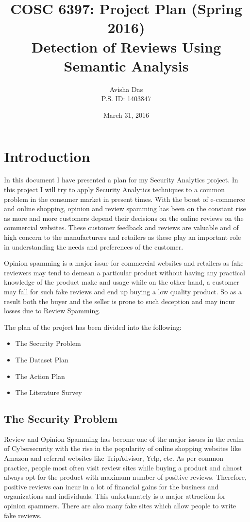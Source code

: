 \documentclass[11pt, a4paper]{article}
\title{COSC 6397: Project Plan (Spring 2016)\\
Detection of Reviews Using Semantic Analysis
}
\author{Avisha Das \\
P.S. ID: 1403847}
\date{March 31, 2016}
\begin{document}
\maketitle


\section{Introduction}

In this document I have presented a plan for my Security Analytics project. In this project I will try to apply Security Analytics techniques to a common problem in the consumer market in present times. With the boost of e-commerce and online shopping, opinion and review spamming has been on the constant rise as more and more customers depend their decisions on the online reviews on the commercial websites. These customer feedback and reviews are valuable and of high concern to the manufacturers and retailers as these play an important role in understanding the needs and preferences of the customer.\cite{survey01}

Opinion spamming is a major issue for commercial websites and retailers as fake reviewers may tend to demean a particular product without having any practical knowledge of the product make and usage while on the other hand, a customer may fall for such fake reviews and end up buying a low quality product. So as a result both the buyer and the seller is prone to such deception and may incur losses due to Review Spamming.

The plan of the project has been divided into the following:
\begin{itemize}
\item The Security Problem
\item The Dataset Plan
\item The Action Plan 
\item The Literature Survey
\end{itemize}

\subsection{The Security Problem}
Review and Opinion Spamming has become one of the major issues in the realm of Cybersecurity with the rise in the popularity of online shopping websites like Amazon and referral websites like TripAdvisor, Yelp, etc. As per common practice, people most often visit review sites while buying a product and almost always opt for the product with maximum number of positive reviews. Therefore, positive reviews can incur in a lot of financial gains for the business and organizations and individuals.
This unfortunately is a major attraction for opinion spammers. There are also many fake sites which allow people to write fake reviews. \cite{op_web}
\end{document}
